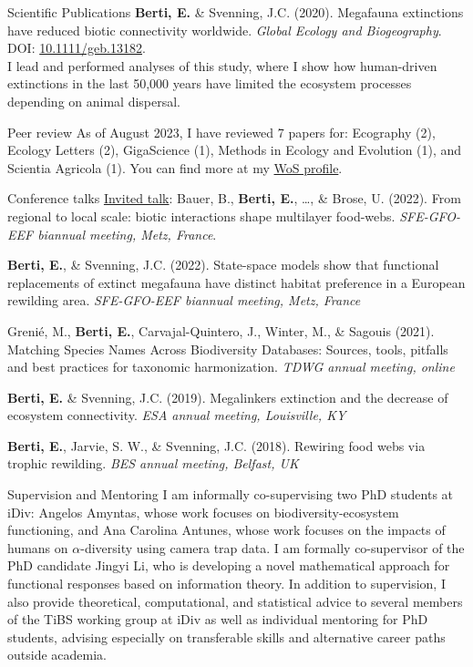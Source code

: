 \documentclass{resume} %
\begin{document}
\begin{rSection}{Scientific Publications}
\textbf{Berti, E.} \& Svenning, J.C. (2020). Megafauna extinctions have reduced biotic connectivity worldwide. \textit{Global Ecology and Biogeography}. DOI: \href{https://doi.org/10.1111/geb.13182}{10.1111/geb.13182}.\\
I lead and performed analyses of this study, where I show how human-driven extinctions in the last 50,000 years have limited the ecosystem processes depending on animal dispersal.
\end{rSection}

\begin{rSection}{Peer review}
	As of August 2023, I have reviewed 7 papers for: Ecography (2), Ecology Letters (2), GigaScience (1), Methods in Ecology and Evolution (1), and Scientia Agricola (1). You can find more at my \href{https://www.webofscience.com/wos/author/record/2190178}{WoS profile}.
\end{rSection}

\begin{rSection}{Conference talks}
\underline{Invited talk}: Bauer, B., \textbf{Berti, E.}, \dots, \& Brose, U. (2022). From regional to local scale: biotic interactions shape multilayer food-webs. \textit{SFE-GFO-EEF biannual meeting, Metz, France}.

\textbf{Berti, E.}, \& Svenning, J.C. (2022). State-space models show that functional replacements of extinct megafauna have distinct habitat preference in a European rewilding area. \textit{SFE-GFO-EEF biannual meeting, Metz, France}

Grenié, M., \textbf{Berti, E.}, Carvajal-Quintero, J., Winter, M., \& Sagouis (2021). Matching Species Names Across Biodiversity Databases: Sources, tools, pitfalls and best practices for taxonomic harmonization. \textit{TDWG annual meeting, online}

\textbf{Berti, E.} \& Svenning, J.C. (2019). Megalinkers extinction and the decrease of ecosystem connectivity. \textit{ESA annual meeting, Louisville, KY}

\textbf{Berti, E.}, Jarvie, S. W., \& Svenning, J.C. (2018). Rewiring food webs via trophic rewilding. \textit{BES annual meeting, Belfast, UK}
\end{rSection}

\begin{rSection}{Supervision and Mentoring}
I am informally co-supervising two PhD students at iDiv: Angelos Amyntas, whose work focuses on biodiversity-ecosystem functioning, and Ana Carolina Antunes, whose work focuses on the impacts of humans on $\alpha$-diversity using camera trap data. I am formally co-supervisor of the PhD candidate Jingyi Li, who is developing a novel mathematical approach for functional responses based on information theory. In addition to supervision, I also provide theoretical, computational, and statistical advice to several members of the TiBS working group at iDiv as well as individual mentoring for PhD students, advising especially on transferable skills and alternative career paths outside academia.
\end{rSection}
\end{document}
